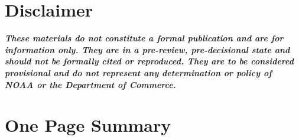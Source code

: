 \documentclass[11pt,
  english,
  a4paper,
]{article}
\begin{document}
\newcommand{\lt}{\ensuremath <}
\newcommand{\gt}{\ensuremath >}

\newlength{\cslhangindent}
\setlength{\cslhangindent}{1.5em}
\newenvironment{cslreferences}%
  {\setlength{\parindent}{0pt}%
  \everypar{\setlength{\hangindent}{\cslhangindent}}\ignorespaces}%
  {\par}


\renewcommand{\thetable}{\roman{table}}
\renewcommand{\thefigure}{\roman{figure}}

\setlength\parskip{0.5em plus 0.1em minus 0.2em}

\vspace{500cm}


\hypertarget{disclaimer}{%
\section*{Disclaimer}\label{disclaimer}}

\leavevmode\tagmcend\tagstructend


\emph{\textbf{These materials do not constitute a formal publication and are for information only. They are in a pre-review, pre-decisional state and should not be formally cited or reproduced. They are to be considered provisional and do not represent any determination or policy of NOAA or the Department of Commerce.}}

\leavevmode\tagmcend\tagstructend\par

\pagebreak


\hypertarget{one-page-summary}{%
\section*{One Page Summary}\label{one-page-summary}}

\leavevmode\tagmcend\tagstructend
\end{document}
